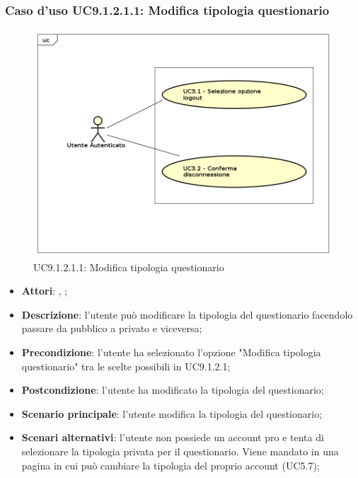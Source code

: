 					\subsubsection{Caso d'uso UC9.1.2.1.1: Modifica tipologia questionario}
					\label{UC9.1.2.1.1}
					\begin{figure}[h]
						\centering
					\includegraphics[scale=0.5,keepaspectratio]{UML/UC9.png}
						\caption{UC9.1.2.1.1: Modifica tipologia questionario}
					\end{figure}
					\FloatBarrier
					\begin{itemize}
						\item \textbf{Attori}: \uau, \uaupro;
						\item \textbf{Descrizione}: l'utente può modificare la tipologia del questionario facendolo passare da pubblico a privato e viceversa; 
						\item \textbf{Precondizione}: l'utente ha selezionato l'opzione "Modifica tipologia questionario" tra le scelte possibili in UC9.1.2.1;
						\item \textbf{Postcondizione}: l'utente ha modificato la tipologia del questionario;
						\item \textbf{Scenario principale}: l'utente modifica la tipologia del questionario;
						\item \textbf{Scenari alternativi}: l'utente non possiede un account pro e tenta di selezionare la tipologia privata per il questionario. Viene mandato in una pagina in cui può cambiare la tipologia del proprio account (UC5.7); 
					\end{itemize}
											

